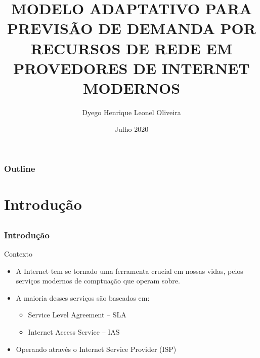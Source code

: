\documentclass[aspectratio=169]{beamer}
\begin{document}
\title[]{\textbf{MODELO ADAPTATIVO PARA PREVISÃO DE DEMANDA POR RECURSOS DE REDE EM PROVEDORES DE INTERNET MODERNOS}}  

\author[Dyego Oliveira]{Dyego Henrique Leonel Oliveira}


\date{Julho 2020} 

\begin{frame}
\titlepage

\end{frame}


\begin{frame}
\frametitle{Outline }
\tableofcontents
\end{frame} 


\section{Introdução}


\subsection{}
\begin{frame}
\frametitle{Introdução}
\begin{block}{Contexto}
    \begin{itemize}
        \item A Internet tem se tornado uma ferramenta crucial em nossas vidas, pelos serviços modernos de comptuação que operam sobre.
        \item A maioria desses serviços são baseados em:
        \begin{itemize}
            \item Service Level Agreement -- SLA
            \item Internet Access Service -- IAS
        \end{itemize}
        \item Operando através o Internet Service Provider (ISP)
    \end{itemize}
\end{block}


\end{frame}
\end{document}
